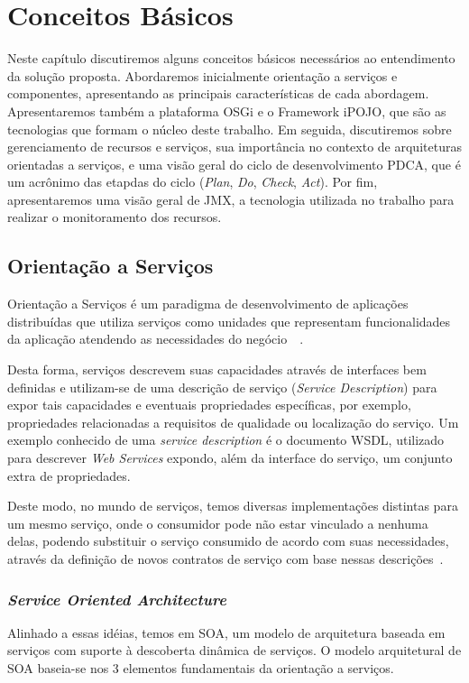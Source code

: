 \chapter{Conceitos Básicos}
\label{ch:2}
Neste capítulo discutiremos alguns conceitos básicos necessários ao entendimento da solução proposta. Abordaremos inicialmente orientação a serviços e componentes, apresentando as principais características de cada abordagem. Apresentaremos também a plataforma OSGi e o Framework iPOJO, que são as tecnologias que formam o núcleo deste trabalho. Em seguida, discutiremos sobre gerenciamento de recursos e serviços, sua importância no contexto de arquiteturas orientadas a serviços, e uma visão geral do ciclo de desenvolvimento PDCA, que é um acrônimo das etapdas do ciclo (\textit{Plan}, \textit{Do}, \textit{Check}, \textit{Act}). Por fim, apresentaremos uma visão geral de JMX, a tecnologia utilizada no trabalho para realizar o monitoramento dos recursos.

\section{Orientação a Serviços}
\label{sec:service}

Orientação a Serviços é um paradigma de desenvolvimento de aplicações distribuídas que utiliza serviços como unidades que representam funcionalidades da aplicação atendendo as necessidades do negócio~\cite{erl2008soa}~\cite{cervantes2005technical}. 

Desta forma, serviços descrevem suas capacidades através de interfaces bem definidas e utilizam-se de uma descrição de serviço (\textit{Service Description}) para expor tais capacidades e eventuais propriedades específicas, por exemplo, propriedades relacionadas a requisitos de qualidade ou localização do serviço. Um exemplo conhecido de uma \textit{service description} é o documento WSDL, utilizado para descrever \textit{Web Services} expondo, além da interface do serviço, um conjunto extra de propriedades.

Deste modo, no mundo de serviços, temos diversas implementações distintas para um mesmo serviço, onde o consumidor pode não estar vinculado a nenhuma delas, podendo substituir o serviço consumido de acordo com suas necessidades, através da definição de novos contratos de serviço com base nessas descrições~\cite{cervantes2005technical}.

\subsection{\textit{Service Oriented Architecture}}
Alinhado a essas idéias, temos em SOA, um modelo de arquitetura baseada em serviços com suporte à descoberta dinâmica de serviços. O modelo arquitetural de SOA baseia-se nos 3 elementos fundamentais da orientação a serviços.

